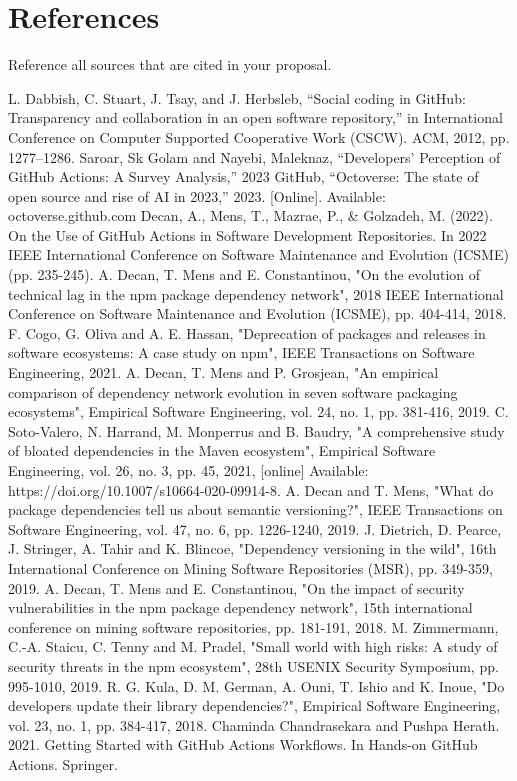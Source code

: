 \documentclass[conference]{IEEEtran}
\begin{document}
\section*{References}
Reference all sources that are cited in your proposal.

\begin{thebibliography}{00}
 L. Dabbish, C. Stuart, J. Tsay, and J. Herbsleb, ``Social coding in GitHub: Transparency and collaboration in an open software repository,'' in International Conference on Computer Supported Cooperative Work (CSCW). ACM, 2012, pp. 1277–1286.
 Saroar, Sk Golam and Nayebi, Maleknaz, ``Developers' Perception of GitHub Actions: A Survey Analysis,'' 2023
 GitHub, “Octoverse: The state of open source and rise of AI in 2023,” 2023. [Online]. Available: octoverse.github.com
 Decan, A., Mens, T., Mazrae, P., \& Golzadeh, M. (2022). On the Use of GitHub Actions in Software Development Repositories. In 2022 IEEE International Conference on Software Maintenance and Evolution (ICSME) (pp. 235-245).
 A. Decan, T. Mens and E. Constantinou, "On the evolution of technical lag in the npm package dependency network", 2018 IEEE International Conference on Software Maintenance and Evolution (ICSME), pp. 404-414, 2018.
 F. Cogo, G. Oliva and A. E. Hassan, "Deprecation of packages and releases in software ecosystems: A case study on npm", IEEE Transactions on Software Engineering, 2021.
 A. Decan, T. Mens and P. Grosjean, "An empirical comparison of dependency network evolution in seven software packaging ecosystems", Empirical Software Engineering, vol. 24, no. 1, pp. 381-416, 2019.
  C. Soto-Valero, N. Harrand, M. Monperrus and B. Baudry, "A comprehensive study of bloated dependencies in the Maven ecosystem", Empirical Software Engineering, vol. 26, no. 3, pp. 45, 2021, [online] Available: https://doi.org/10.1007/s10664-020-09914-8.
 A. Decan and T. Mens, "What do package dependencies tell us about semantic versioning?", IEEE Transactions on Software Engineering, vol. 47, no. 6, pp. 1226-1240, 2019.
 J. Dietrich, D. Pearce, J. Stringer, A. Tahir and K. Blincoe, "Dependency versioning in the wild", 16th International Conference on Mining Software Repositories (MSR), pp. 349-359, 2019.
A. Decan, T. Mens and E. Constantinou, "On the impact of security vulnerabilities in the npm package dependency network", 15th international conference on mining software repositories, pp. 181-191, 2018.
 M. Zimmermann, C.-A. Staicu, C. Tenny and M. Pradel, "Small world with high risks: A study of security threats in the npm ecosystem", 28th USENIX Security Symposium, pp. 995-1010, 2019.
 R. G. Kula, D. M. German, A. Ouni, T. Ishio and K. Inoue, "Do developers update their library dependencies?", Empirical Software Engineering, vol. 23, no. 1, pp. 384-417, 2018.
 Chaminda Chandrasekara and Pushpa Herath. 2021. Getting Started with GitHub Actions Workflows. In Hands-on GitHub Actions. Springer.
\end{thebibliography}
\vspace{12pt}
\end{document}
